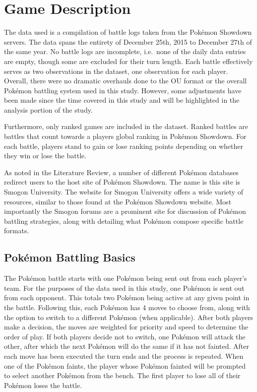 \documentclass[12pt,twoside]{reedthesis}
\begin{document}
  \chapter{Game Description}\label{game-description}
  
  The data used is a compilation of battle logs taken from the Pokémon
  Showdown servers. The data spans the entirety of December 25th, 2015 to
  December 27th of the same year. No battle logs are incomplete, i.e.~none
  of the daily data entries are empty, though some are excluded for their
  turn length. Each battle effectively serves as two observations in the
  dataset, one observation for each player. Overall, there were no
  dramatic overhauls done to the OU format or the overall Pokémon battling
  system used in this study. However, some adjustments have been made
  since the time covered in this study and will be highlighted in the
  analysis portion of the study.
  
  Furthermore, only ranked games are included in the dataset. Ranked
  battles are battles that count towards a players global ranking in
  Pokémon Showdown. For each battle, players stand to gain or lose ranking
  points depending on whether they win or lose the battle.
  
  As noted in the Literature Review, a number of different Pokémon
  databases redirect users to the host site of Pokémon Showdown. The name
  is this site is Smogon University. The website for Smogon University
  offers a wide variety of resources, similar to those found at the
  Pokémon Showdown website. Most importantly the Smogon forums are a
  prominent site for discussion of Pokémon battling strategies, along with
  detailing what Pokémon compose specific battle formats.
  
  \section{Pokémon Battling Basics}\label{pokemon-battling-basics}
  
  The Pokémon battle starts with one Pokémon being sent out from each
  player's team. For the purposes of the data used in this study, one
  Pokémon is sent out from each opponent. This totals two Pokémon being
  active at any given point in the battle. Following this, each Pokémon
  has 4 moves to choose from, along with the option to switch to a
  different Pokémon (when applicable). After both players make a decision,
  the moves are weighted for priority and speed to determine the order of
  play. If both players decide not to switch, one Pokémon will attack the
  other, after which the next Pokémon will do the same if it has not
  fainted. After each move has been executed the turn ends and the process
  is repeated. When one of the Pokémon faints, the player whose Pokémon
  fainted will be prompted to select another Pokémon from the bench. The
  first player to lose all of their Pokémon loses the battle.
  
\end{document}
